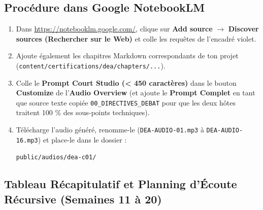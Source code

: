 \documentclass[11pt,a4paper]{article}
\begin{document}
\subsection{Procédure dans Google NotebookLM}
\begin{enumerate}[label=\textbf{Étape \arabic* :}]
    \item Dans \url{https://notebooklm.google.com/}, clique sur \textbf{Add source} $\rightarrow$ \textbf{Discover sources (Rechercher sur le Web)} et colle les requêtes de l'encadré violet.
    \item Ajoute également les chapitres Markdown correspondants de ton projet (\texttt{content/certifications/dea/chapters/...}).
    \item Colle le \textbf{Prompt Court Studio (< 450 caractères)} dans le bouton \textbf{Customize} de l'\textbf{Audio Overview} (et ajoute le \textbf{Prompt Complet} en tant que source texte copiée \texttt{00\_DIRECTIVES\_DEBAT} pour que les deux hôtes traitent 100 \% des sous-points techniques).
    \item Télécharge l'audio généré, renomme-le (\texttt{DEA-AUDIO-01.mp3} à \texttt{DEA-AUDIO-16.mp3}) et place-le dans le dossier :
    \begin{center}
        \texttt{public/audios/dea-c01/}
    \end{center}
\end{enumerate}

\subsection{Tableau Récapitulatif et Planning d'Écoute Récursive (Semaines 11 à 20)}
\end{document}
